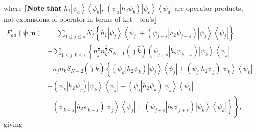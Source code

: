 \documentclass[aps,preprint]{revtex4}%
\begin{document}
where $\lceil$\textbf{Note that }$h_{1}\left\vert \psi_{a}\right\rangle
\left\langle \psi_{b}\right\vert $, $\left(  \left.  \psi_{a}\right\vert
h_{2}\psi_{b}\right)  \left\vert \psi_{c}\right\rangle \left\langle \psi
_{d}\right\vert $ are operator products, not expansions of operator in terms
of ket - bra's$\rfloor$\textbf{ }
\begin{align}
F_{aa}\left(  \mathbf{\psi,n}\right)   &  =\sum_{1\leq j\leq s}N_{j}\left\{
h_{1}\left\vert \psi_{j}\right\rangle \left\langle \psi_{j}\right\vert
+\left(  \left.  \psi_{j+s}\right\vert h_{2}\psi_{j+s}\right)  \left\vert
\psi_{j}\right\rangle \left\langle \psi_{j}\right\vert \right\} \nonumber\\
&  +\sum_{1\leq j,k\leq s}\left\{  n_{j}^{\frac{1}{2}}n_{k}^{\frac{1}{2}%
}S_{N-1}\left(  \hat{\jmath}\hat{k}\right)  \right.  \left(  \left.
\psi_{j+s}\right\vert h_{2}\psi_{k+s}\right)  \left\vert \psi_{k}\right\rangle
\left\langle \psi_{j}\right\vert \nonumber\\
&  +n_{j}n_{k}S_{N-2}\left(  \hat{\jmath}\hat{k}\right)  \left\{  \left(
\left.  \psi_{k}\right\vert h_{2}\psi_{k}\right)  \left\vert \psi
_{j}\right\rangle \left\langle \psi_{j}\right\vert +\left(  \left.  \psi
_{j}\right\vert h_{2}\psi_{j}\right)  \left\vert \psi_{k}\right\rangle
\left\langle \psi_{k}\right\vert \right. \nonumber\\
&  -\left(  \left.  \psi_{k}\right\vert h_{2}\psi_{j}\right)  \left\vert
\psi_{k}\right\rangle \left\langle \psi_{j}\right\vert -\left(  \left.
\psi_{j}\right\vert h_{2}\psi_{k}\right)  \left\vert \psi_{j}\right\rangle
\left\langle \psi_{k}\right\vert \nonumber\\
&  +\left.  \overset{}{\left.  \left(  \left.  \psi_{k+s}\right\vert h_{2}%
\psi_{k+s}\right)  \left\vert \psi_{j}\right\rangle \left\langle \psi
_{j}\right\vert +\left(  \left.  \psi_{j+s}\right\vert h_{2}\psi_{j+s}\right)
\left\vert \psi_{k}\right\rangle \left\langle \psi_{k}\right\vert \right\}
}\right\}  ,
\end{align}
giving
\end{document}
